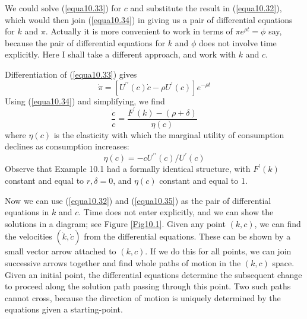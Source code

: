 We could solve (\ref{equa10.33}) for $c$ and substitute the result in (\ref{equa10.32}), which would then join (\ref{equa10.34}) in giving us a pair of differential equations for $k$ and $\pi$. Actually it is more convenient to work in terms of $\pi e^{\rho t} = \phi $ say, because the pair of differential equations for $k$ and $\phi$ does not involve time explicitly. Here I shall take a different approach, and work with $k$ and $c$.

Differentiation of (\ref{equa10.33}) gives
\begin{equation*}
 \dot{\pi} = [ U^{\prime \prime}(c) \dot{c} - \rho U^\prime (c) ] e^{-\rho t}
\end{equation*}
Using (\ref{equa10.34}) and simplifying, we find
\begin{equation} \label{equa10.35}
\dfrac{\dot{c}}{c} = \dfrac{F^\prime(k) - (\rho + \delta)}{ \eta(c)}
\end{equation}
where $\eta(c)$ is the elasticity with which the marginal utility of consumption declines as consumption increases:
\begin{equation*}
 \eta(c) = -c U^{\prime \prime}(c) / U^\prime (c)
\end{equation*}
Observe that Example 10.1 had a formally identical structure, with $F^\prime(k)$ constant and equal to $r, \delta=0$, and $\eta(c)$ constant and equal to 1.

Now we can use (\ref{equa10.32}) and (\ref{equa10.35}) as the pair of differential equations in $k$ and $c$. Time does not enter explicitly, and we can show the solutions in a diagram; see Figure \ref{Fig10.1}. Given any point $(k,c)$, we can find the velocities $(\dot{k}, \dot{c})$ from the differential equations. These can be shown by a small vector arrow attached to $(k,c)$. If we do this for all points, we can join successive arrows together and find whole paths of motion in the $(k,c)$ space. Given an initial point, the differential equations determine the subsequent change to proceed along the solution path passing through this point. Two such paths cannot cross, because the direction of motion is uniquely determined by the equations given a starting-point.

